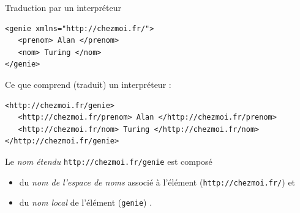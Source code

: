 \begin{frame}[containsverbatim]{Traduction par un interpréteur}

\begin{lstlisting}
<genie xmlns="http://chezmoi.fr/">
   <prenom> Alan </prenom>
   <nom> Turing </nom>
</genie>
\end{lstlisting}

Ce que comprend (traduit) un interpréteur :

\begin{lstlisting}
<http://chezmoi.fr/genie>
   <http://chezmoi.fr/prenom> Alan </http://chezmoi.fr/prenom>
   <http://chezmoi.fr/nom> Turing </http://chezmoi.fr/nom>
</http://chezmoi.fr/genie>
\end{lstlisting}

\bigskip

Le \emph{nom étendu} \verb?http://chezmoi.fr/genie? est composé 
\begin{itemize}
\item du \emph{nom de l'espace de noms} associé à l'élément (\verb?http://chezmoi.fr/?) et 
\item du \emph{nom local} de l'élément (\verb?genie?) \cite{w3c/ns}.
\end{itemize}

\end{frame}



